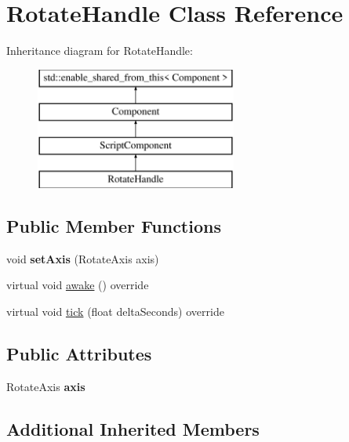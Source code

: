 \hypertarget{class_rotate_handle}{}\section{Rotate\+Handle Class Reference}
\label{class_rotate_handle}
Inheritance diagram for Rotate\+Handle\+:\begin{figure}[H]
\begin{center}
\leavevmode
\includegraphics[height=4.000000cm]{class_rotate_handle}
\end{center}
\end{figure}
\subsection*{Public Member Functions}
\begin{DoxyCompactItemize}
\item 
\hypertarget{class_rotate_handle_ac3e55cbbed2ffd3914e5012f9075551d}{}void {\bfseries set\+Axis} (Rotate\+Axis axis)\label{class_rotate_handle_ac3e55cbbed2ffd3914e5012f9075551d}

\item 
virtual void \hyperlink{class_rotate_handle_a93caa7dd2992d5dc3fcef9cbc4278bed}{awake} () override
\item 
virtual void \hyperlink{class_rotate_handle_a58b0a9ebbcd28378aed805628107eef4}{tick} (float delta\+Seconds) override
\end{DoxyCompactItemize}
\subsection*{Public Attributes}
\begin{DoxyCompactItemize}
\item 
\hypertarget{class_rotate_handle_aabd470e68ebdb6e8f17f55041d952a1f}{}Rotate\+Axis {\bfseries axis}\label{class_rotate_handle_aabd470e68ebdb6e8f17f55041d952a1f}

\end{DoxyCompactItemize}
\subsection*{Additional Inherited Members}


